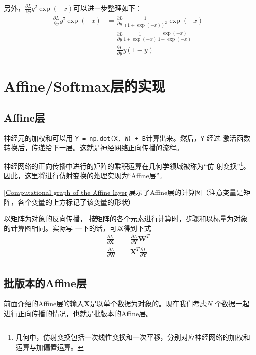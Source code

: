 另外，$\frac{\partial L}{\partial y}y^2\exp(-x)$可以进一步整理如下：
\begin{equation*}
    \begin{aligned}
        \frac{\partial L}{\partial y}y^2\exp(-x) & =\frac{\partial L}{\partial y}\frac{1}{(1+\exp(-x))^2}\exp(-x)                \\
                                                 & =\frac{\partial L}{\partial y}\frac{1}{1+\exp(-x)}\frac{\exp(-x)}{1+\exp(-x)} \\
                                                 & =\frac{\partial L}{\partial y}y(1-y)
    \end{aligned}
\end{equation*}
\section{Affine/Softmax层的实现}
\subsection{Affine层}
神经元的加权和可以用 \verb|Y = np.dot(X, W) + B|计算出来。然后，\verb|Y| 经过
激活函数转换后，传递给下一层。这就是神经网络正向传播的流程。
\begin{tcolorbox}
    神经网络的正向传播中进行的矩阵的乘积运算在几何学领域被称为“仿
    射变换”\footnote{几何中，仿射变换包括一次线性变换和一次平移，分别对应神经网络的加权和运算与加偏置运算。}。因此，这里将进行仿射变换的处理实现为“Affine层”。
\end{tcolorbox}

\autoref{Computational graph of the Affine layer}展示了Affine层的计算图（注意变量是矩阵，各个变量的上方标记了该变量的形状）

以矩阵为对象的反向传播，
按矩阵的各个元素进行计算时，步骤和以标量为对象的计算图相同。实际写
一下的话，可以得到下式
\begin{equation}
    \begin{aligned}
        \frac{\partial L}{\partial \bm{X}} & = \frac{\partial L}{\partial \bm{Y}}\bm{W}^T \\
        \frac{\partial L}{\partial \bm{W}} & = \bm{X}^T\frac{\partial L}{\partial \bm{Y}} \\
    \end{aligned}
\end{equation}

\subsection{批版本的Affine层}
前面介绍的Affine层的输入$\bm{X}$是以单个数据为对象的。现在我们考虑$N$
个数据一起进行正向传播的情况，也就是批版本的Affine层。


